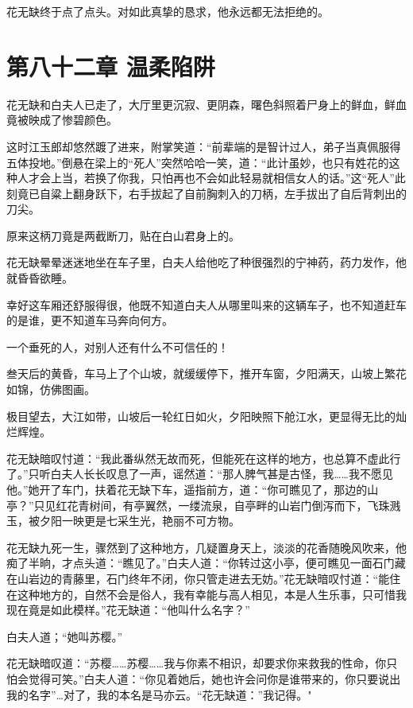 \documentclass[12pt,oneside]{book}
\begin{document}
花无缺终于点了点头。对如此真挚的恳求，他永远都无法拒绝的。

\hypertarget{ux7b2cux516bux5341ux4e8cux7ae0-ux6e29ux67d4ux9677ux9631}{%
\chapter{第八十二章
温柔陷阱}\label{ux7b2cux516bux5341ux4e8cux7ae0-ux6e29ux67d4ux9677ux9631}}

花无缺和白夫人已走了，大厅里更沉寂、更阴森，曙色斜照着尸身上的鲜血，鲜血竟被映成了惨碧颜色。

这时江玉郎却悠然踱了进来，附掌笑道：``前辈端的是智计过人，弟子当真佩服得五体投地。''倒悬在梁上的``死人''突然哈哈一笑，道：``此计虽妙，也只有姓花的这种人才会上当，若换了你我，只怕再也不会如此轻易就相信女人的话。''这``死人''此刻竟已自粱上翻身跃下，右手拔起了自前胸刺入的刀柄，左手拔出了自后背刺出的刀尖。

原来这柄刀竟是两截断刀，贴在白山君身上的。

花无缺晕晕迷迷地坐在车子里，白夫人给他吃了种很强烈的宁神药，药力发作，他就昏昏欲睡。

幸好这车厢还舒服得很，他既不知道白夫人从哪里叫来的这辆车子，也不知道赶车的是谁，更不知道车马奔向何方。

一个垂死的人，对别人还有什么不可信任的！

叁天后的黄昏，车马上了个山坡，就缓缓停下，推开车窗，夕阳满天，山坡上繁花如锦，仿佛图画。

极目望去，大江如带，山坡后一轮红日如火，夕阳映照下舱江水，更显得无比的灿烂辉煌。

花无缺暗叹忖道：``我此番纵然无故而死，但能死在这样的地方，也总算不虚此行了。''只听白夫人长长叹息了一声，谣然道：``那人脾气甚是古怪，我\ldots\ldots 我不愿见他。''她开了车门，扶着花无缺下车，遥指前方，道：``你可瞧见了，那边的山亭？''只见红花青树间，有亭翼然，一缕流泉，自亭畔的山岩门倒泻而下，飞珠溅玉，被夕阳一映更是七采生光，艳丽不可方物。

花无缺九死一生，骤然到了这种地方，几疑置身天上，淡淡的花香随晚风吹来，他痴了半晌，才点头道：``瞧见了。''白夫人道：``你转过这小亭，便可瞧见一面石门藏在山岩边的青藤里，石门终年不闭，你只管走进去无妨。''花无缺暗叹忖道：``能住在这种地方的，自然不会是俗人，我有幸能与高人相见，本是人生乐事，只可惜我现在竟是如此模样。''花无缺道：``他叫什么名字？''

白夫人道；``她叫苏樱。''

花无缺暗叹道：``苏樱\ldots\ldots 苏樱\ldots\ldots 我与你素不相识，却要求你来救我的性命，你只怕会觉得可笑。''白夫人道：``你见着她后，她也许会问你是谁带来的，你只要说出我的名字''\ldots 对了，我的本名是马亦云。``花无缺道：''我记得。"
\end{document}
